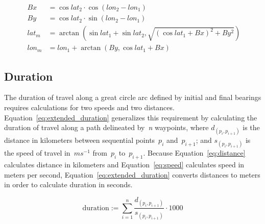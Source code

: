 \begin{figure}[ht]
	\begin{align}
			\nonumber Bx & = \cos lat_2 \cdot \cos(lon_2 - lon_1)\\
			\nonumber By & = \cos lat_2 \cdot \sin(lon_2 - lon_1)\\
		\label{eq:midpoint_latitude}
			lat_m & = \arctan(\sin lat_1 + \sin lat_2, \sqrt{(\cos lat_1 + Bx)^2 + By^2})\\
		\label{eq:midpoint_longitude}
			lon_m & = lon_1 + \arctan(By, \cos lat_1 + Bx)
	\end{align}
\end{figure}

\subsection{Duration}

The duration of travel along a great circle arc defined by initial and final bearings requires calculations for two speeds and two distances. Equation~\ref{eq:extended_duration} generalizes this requirement by calculating the duration of travel along a path delineated by~\emph{n} waypoints, where $d_{(p_i, p_{i + 1})}$ is the distance in kilometers between sequential points~$p_i$ and~$p_{i + 1}$; and $s_{(p_i, p_{i + 1})}$ is the speed of travel in~$ms^{-1}$ from~$p_i$ to~$p_{i + 1}$. Because Equation~\ref{eq:distance} calculates distance in kilometers and Equation~\ref{eq:speed} calculates speed in meters per second, Equation~\ref{eq:extended_duration} converts distances to meters in order to calculate duration in seconds.

\begin{figure}[ht]
	\begin{equation}
		\label{eq:extended_duration}
			\text{duration} := \sum_{i=1}^n \frac{d_{(p_i, p_{i + 1})}}{s_{(p_i, p_{i + 1})}} \cdot 1000
	\end{equation}
\end{figure}
